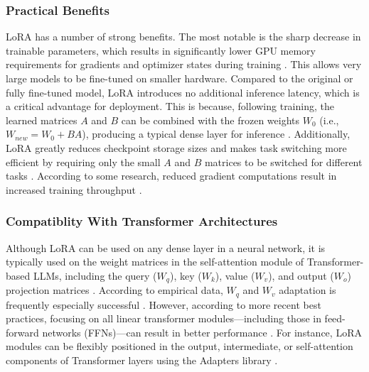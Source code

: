 \documentclass{DESSThesis}
\begin{document}
\subsubsection{Practical Benefits}
LoRA has a number of strong benefits. The most notable is the sharp decrease in trainable parameters, which results in significantly lower GPU memory requirements for gradients and optimizer states during training \cite{hu_lora_2021,lialin_scaling_2023}. This allows very large models to be fine-tuned on smaller hardware. Compared to the original or fully fine-tuned model, LoRA introduces no additional inference latency, which is a critical advantage for deployment. This is because, following training, the learned matrices $A$ and $B$ can be combined with the frozen weights $W_0$ (i.e., $W_{new} = W_0 + BA$), producing a typical dense layer for inference \cite{hu_lora_2021,poth_adapters_2023,sheng_s-lora_2024}. Additionally, LoRA greatly reduces checkpoint storage sizes and makes task switching more efficient by requiring only the small $A$ and $B$ matrices to be switched for different tasks \cite{hu_lora_2021,mao_survey_2025}. According to some research, reduced gradient computations result in increased training throughput \cite{hu_lora_2021}.

\subsubsection{Compatiblity With Transformer Architectures}
Although LoRA can be used on any dense layer in a neural network, it is typically used on the weight matrices in the self-attention module of Transformer-based LLMs, including the query ($W_q$), key ($W_k$), value ($W_v$), and output ($W_o$) projection matrices \cite{hu_lora_2021,lialin_scaling_2023}. According to empirical data, $W_q$ and $W_v$ adaptation is frequently especially successful \cite{hu_lora_2021}. However, according to more recent best practices, focusing on all linear transformer modules—including those in feed-forward networks (FFNs)—can result in better performance \cite{biderman_lora_2024,hu_llm-adapters_2023}. For instance, LoRA modules can be flexibly positioned in the output, intermediate, or self-attention components of Transformer layers using the Adapters library \cite{poth_adapters_2023}.
\end{document}

